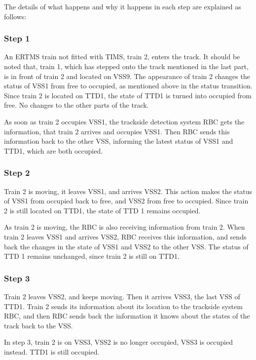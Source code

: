 \documentclass[article,dr=phil,type=msc,colorback,accentcolor=tud9c]{tudthesis}
\begin{document}
  The details of what happens and why it happens in each step are explained as follows:
	
	\subsubsection{Step 1}
	
    An ERTMS train not fitted with TIMS, train 2, enters the track. It should be noted that, train 1, which has stepped onto the track mentioned in the last part, is in front of train 2 and located on VSS9. The appearance of train 2 changes the status of VSS1 from free to occupied, as mentioned above in the status transition. Since train 2 is located on TTD1, the state of TTD1 is turned into occupied from free. No changes to the other parts of the track. 
    
    As soon as train 2 occupies VSS1, the trackside detection system RBC gets the information, that train 2 arrives and occupies VSS1. Then RBC sends this information back to the other VSS, informing the latest status of VSS1 and TTD1, which are both occupied.    
	
	\subsubsection{Step 2}
	
    Train 2 is moving, it leaves VSS1, and arrives VSS2. This action makes the status of VSS1 from occupied back to free, and VSS2 from free to occupied. Since train 2 is still located on TTD1, the state of TTD 1 remains occupied.
    
    As train 2 is moving, the RBC is also receiving information from train 2. When train 2 leaves VSS1 and arrives VSS2, RBC receives this information, and sends back the changes in the state of VSS1 and VSS2 to the other VSS. The status of TTD 1 remains unchanged, since train 2 is still on TTD1.

	\subsubsection{Step 3}
	
    Train 2 leaves VSS2, and keeps moving. Then it arrives VSS3, the last VSS of TTD1. Train 2 sends its information about its location to the trackside system RBC, and then RBC sends back the information it knows about the states of the track back to the VSS.
    
    In step 3, train 2 is on VSS3, VSS2 is no longer occupied, VSS3 is occupied instead. TTD1 is still occupied.
    
\end{document}
